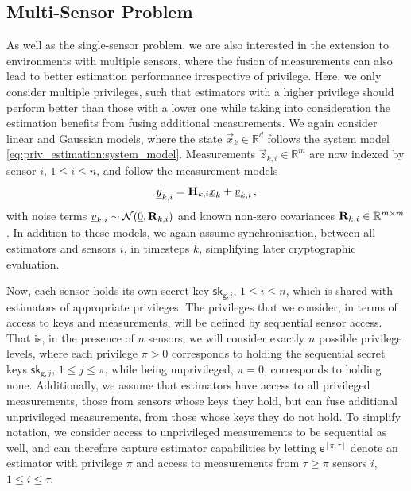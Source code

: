 \subsection{Multi-Sensor Problem}\label{subsec:priv_estimation:fusion_problem}
As well as the single-sensor problem, we are also interested in the extension to environments with multiple sensors, where the fusion of measurements can also lead to better estimation performance irrespective of privilege. Here, we only consider multiple privileges, such that estimators with a higher privilege should perform better than those with a lower one while taking into consideration the estimation benefits from fusing additional measurements. We again consider linear and Gaussian models, where the state $\vec{x}_k \in \mathbb{R}^d$ follows the system model \eqref{eq:priv_estimation:system_model}. Measurements $\vec{z}_{k,i} \in \mathbb{R}^m$ are now indexed by sensor $i$, $1\leq i\leq n$, and follow the measurement models
\begin{equation}\label{eq:priv_estimation:multi_sensor_measurement_models}
    {\underline{y}}_{k,i} = {{\mathbf{H}}}_{k,i} {\underline{x}}_k + {\underline{v}}_{k,i}\,,
\end{equation}
with noise terms ${\underline{v}}_{k,i} \sim \mathcal{N}({\underline{0}},{{\mathbf{R}}}_{k,i})$ and known non-zero covariances ${{\mathbf{R}}}_{k,i} \in \mathbb{R}^{m \times m}$. In addition to these models, we again assume synchronisation, between all estimators and sensors $i$, in timesteps $k$, simplifying later cryptographic evaluation.

Now, each sensor holds its own secret key $\mathsf{sk}_{\mathsf{g}, i}$, $1\leq i\leq n$, which is shared with estimators of appropriate privileges. The privileges that we consider, in terms of access to keys and measurements, will be defined by sequential sensor access. That is, in the presence of $n$ sensors, we will consider exactly $n$ possible privilege levels, where each privilege $\pi>0$ corresponds to holding the sequential secret keys $\mathsf{sk}_{\mathsf{g},j}$, $1\leq j\leq \pi$, while being unprivileged, $\pi=0$, corresponds to holding none. Additionally, we assume that estimators have access to all privileged measurements, those from sensors whose keys they hold, but can fuse additional unprivileged measurements, from those whose keys they do not hold. To simplify notation, we consider access to unprivileged measurements to be sequential as well, and can therefore capture estimator capabilities by letting $\mathsf{e}^{[\pi,\tau]}$ denote an estimator with privilege $\pi$ and access to measurements from $\tau\geq\pi$ sensors $i$, $1\leq i\leq \tau$.

